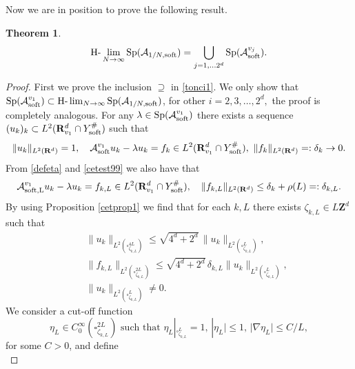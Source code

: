 \documentclass[11pt]{article}
\newcommand\soft{{\rm soft}}
\def\RR{\R}
\newcommand{\R}{\mathbf{R}}
\def\AA{\mathcal{A}}
\DeclareMathOperator{\Sp}{Sp}
\newtheorem{theorem}{Theorem}[section]
\theoremstyle{remark}
\begin{document}
Now we are in position to prove the following result.
\begin{theorem} \label{th5.5}
	\begin{equation} \label{tonci1}  \text{H-}\lim_{N \to \infty} \Sp (\AA_{1/N,\soft})=\bigcup_{j=1,\dots 2^d} \mathrm{Sp} (\AA_\soft^{v_j}). \end{equation}
\end{theorem}
\begin{proof}

	First we prove the inclusion $\supseteq$ in \eqref{tonci1}.
	We only show that $\Sp (\AA_\soft ^{v_1})\subset \text{H-}\lim_{N \to \infty} \Sp (\AA_{1/N,\soft})$,  for other $i=2,3,\dots, 2^d,$ the proof is completely analogous.
	For any $\lambda \in \Sp  (\AA_\soft ^{v_1})$ there exists
	a sequence $(u_k)_k \subset L^2(\mathbf{R}^d_{v_1} \cap Y_\soft^{\#})$ such that
	\begin{equation} \label{cetest99}
		\|u_k\|_{L^2(\RR^d)}=1, \quad \AA_\soft ^{v_1} u_k-\lambda u_k=f_k \in L^2(\RR^d_{v_1} \cap Y_\soft^{\#}), \  \|f_k\|_{L^2(\RR^d)}=:\delta_k \to 0. 	
	\end{equation}
	From \eqref{defeta} and  \eqref{cetest99} we also have that
	\begin{equation*} %
		\mathcal{A}_{\rm soft,L}^{v_1} u_k-\lambda u_k=f_{k,L} \in L^2(\RR^d_{v_1} \cap Y_\soft^{\#}), \quad \|f_{k,L}\|_{L^2(\RR^d)} \leq \delta_k +\rho(L)=:\delta_{k,L}.
	\end{equation*}
	By using Proposition \ref{cetprop1}   we find that   for each $k,L$  there exists $\zeta_{k,L} \in L\mathbf{Z}^d$ such that
	\begin{eqnarray}\label{prd6}
		& &\|  u_k\|_{L^2(\square^{4L}_{\zeta_{k,L}})} \leq \sqrt{4^d+  2^d}\, \|  u_k\|_{L^2(\square^{L}_{\zeta_{k,L}})},  \\ \label{utoest23}  & &   \| f_{k,L}\|_{L^2(\square^{2L}_{\zeta_{k,L}})} \leq \sqrt{4^d+  2^d}\, \delta_{k,L} \| u_k\|_{L^2(\square^{L}_{\zeta_{k,L}})}, \\ & & \label{prd8}  \| u_k\|_{L^2(\square^{L}_{\zeta_{k,L}})} \neq 0.
	\end{eqnarray}
		We consider a cut-off function
		\begin{equation}\label{104}
			\eta_L \in C_0^{\infty}(\square^{2L}_{\zeta_{k,L}}) \mbox{ such that } \eta_L|_{\square^L_{\zeta_{k,L}}}=1,\, |\eta_L|\leq 1,\, |\nabla \eta_L|\leq C/L,
		\end{equation}
		for some $C>0$,   and define
	\begin{equation} \label{utoest20}

\end{equation}
\end{proof}
\end{document}
